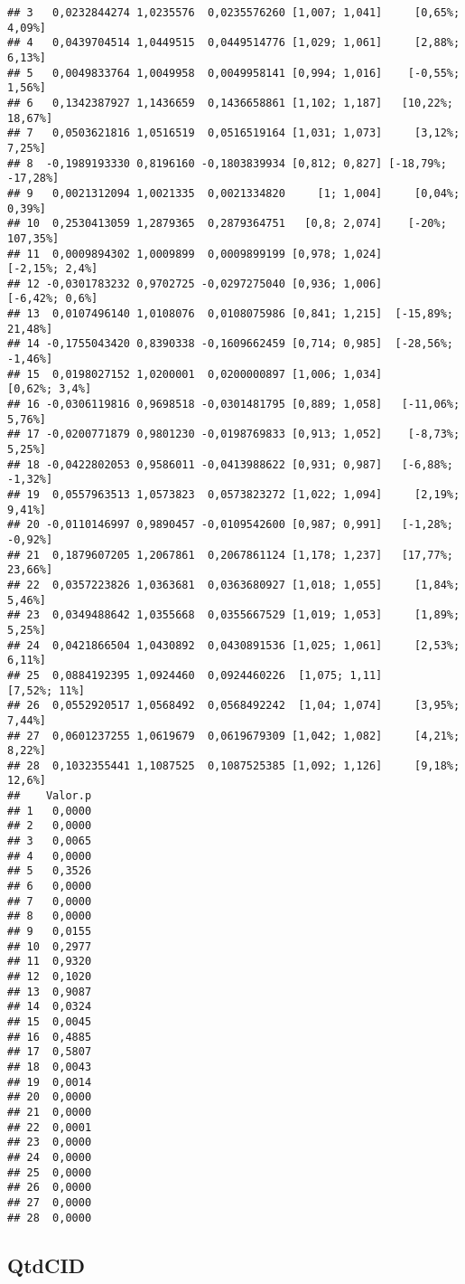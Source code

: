 \documentclass[
]{article}
\begin{document}
\begin{verbatim}
## 3   0,0232844274 1,0235576  0,0235576260 [1,007; 1,041]     [0,65%; 4,09%]
## 4   0,0439704514 1,0449515  0,0449514776 [1,029; 1,061]     [2,88%; 6,13%]
## 5   0,0049833764 1,0049958  0,0049958141 [0,994; 1,016]    [-0,55%; 1,56%]
## 6   0,1342387927 1,1436659  0,1436658861 [1,102; 1,187]   [10,22%; 18,67%]
## 7   0,0503621816 1,0516519  0,0516519164 [1,031; 1,073]     [3,12%; 7,25%]
## 8  -0,1989193330 0,8196160 -0,1803839934 [0,812; 0,827] [-18,79%; -17,28%]
## 9   0,0021312094 1,0021335  0,0021334820     [1; 1,004]     [0,04%; 0,39%]
## 10  0,2530413059 1,2879365  0,2879364751   [0,8; 2,074]    [-20%; 107,35%]
## 11  0,0009894302 1,0009899  0,0009899199 [0,978; 1,024]     [-2,15%; 2,4%]
## 12 -0,0301783232 0,9702725 -0,0297275040 [0,936; 1,006]     [-6,42%; 0,6%]
## 13  0,0107496140 1,0108076  0,0108075986 [0,841; 1,215]  [-15,89%; 21,48%]
## 14 -0,1755043420 0,8390338 -0,1609662459 [0,714; 0,985]  [-28,56%; -1,46%]
## 15  0,0198027152 1,0200001  0,0200000897 [1,006; 1,034]      [0,62%; 3,4%]
## 16 -0,0306119816 0,9698518 -0,0301481795 [0,889; 1,058]   [-11,06%; 5,76%]
## 17 -0,0200771879 0,9801230 -0,0198769833 [0,913; 1,052]    [-8,73%; 5,25%]
## 18 -0,0422802053 0,9586011 -0,0413988622 [0,931; 0,987]   [-6,88%; -1,32%]
## 19  0,0557963513 1,0573823  0,0573823272 [1,022; 1,094]     [2,19%; 9,41%]
## 20 -0,0110146997 0,9890457 -0,0109542600 [0,987; 0,991]   [-1,28%; -0,92%]
## 21  0,1879607205 1,2067861  0,2067861124 [1,178; 1,237]   [17,77%; 23,66%]
## 22  0,0357223826 1,0363681  0,0363680927 [1,018; 1,055]     [1,84%; 5,46%]
## 23  0,0349488642 1,0355668  0,0355667529 [1,019; 1,053]     [1,89%; 5,25%]
## 24  0,0421866504 1,0430892  0,0430891536 [1,025; 1,061]     [2,53%; 6,11%]
## 25  0,0884192395 1,0924460  0,0924460226  [1,075; 1,11]       [7,52%; 11%]
## 26  0,0552920517 1,0568492  0,0568492242  [1,04; 1,074]     [3,95%; 7,44%]
## 27  0,0601237255 1,0619679  0,0619679309 [1,042; 1,082]     [4,21%; 8,22%]
## 28  0,1032355441 1,1087525  0,1087525385 [1,092; 1,126]     [9,18%; 12,6%]
##    Valor.p
## 1   0,0000
## 2   0,0000
## 3   0,0065
## 4   0,0000
## 5   0,3526
## 6   0,0000
## 7   0,0000
## 8   0,0000
## 9   0,0155
## 10  0,2977
## 11  0,9320
## 12  0,1020
## 13  0,9087
## 14  0,0324
## 15  0,0045
## 16  0,4885
## 17  0,5807
## 18  0,0043
## 19  0,0014
## 20  0,0000
## 21  0,0000
## 22  0,0001
## 23  0,0000
## 24  0,0000
## 25  0,0000
## 26  0,0000
## 27  0,0000
## 28  0,0000
\end{verbatim}

\hypertarget{qtdcid}{%
\subsection{QtdCID}\label{qtdcid}}
\end{document}
